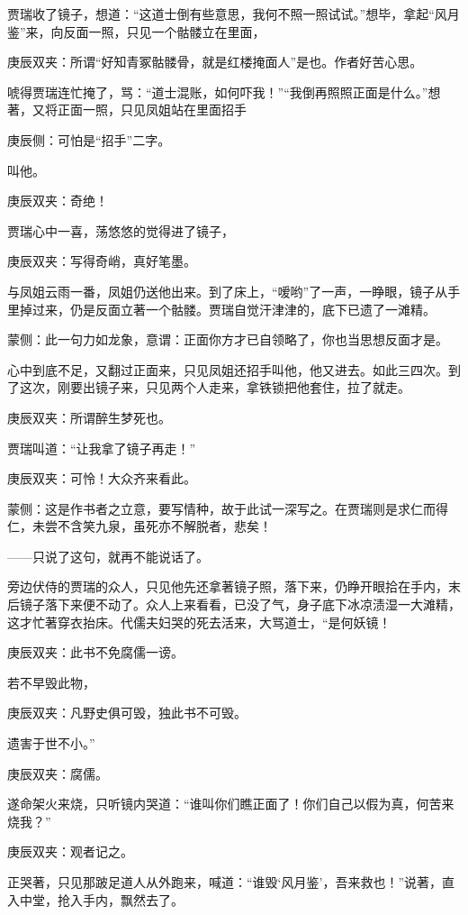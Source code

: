 \begin{parag}
    贾瑞收了镜子，想道：“这道士倒有些意思，我何不照一照试试。”想毕，拿起“风月鉴”来，向反面一照，只见一个骷髅立在里面，\begin{note}庚辰双夹：所谓“好知青冢骷髅骨，就是红楼掩面人”是也。作者好苦心思。\end{note}唬得贾瑞连忙掩了，骂：“道士混账，如何吓我！”“我倒再照照正面是什么。”想著，又将正面一照，只见凤姐站在里面招手\begin{note}庚辰侧：可怕是“招手”二字。\end{note}叫他。\begin{note}庚辰双夹：奇绝！\end{note}贾瑞心中一喜，荡悠悠的觉得进了镜子，\begin{note}庚辰双夹：写得奇峭，真好笔墨。\end{note}与凤姐云雨一番，凤姐仍送他出来。到了床上，“嗳哟”了一声，一睁眼，镜子从手里掉过来，仍是反面立著一个骷髅。贾瑞自觉汗津津的，底下已遗了一滩精。\begin{note}蒙侧：此一句力如龙象，意谓：正面你方才已自领略了，你也当思想反面才是。\end{note}心中到底不足，又翻过正面来，只见凤姐还招手叫他，他又进去。如此三四次。到了这次，刚要出镜子来，只见两个人走来，拿铁锁把他套住，拉了就走。\begin{note}庚辰双夹：所谓醉生梦死也。\end{note}贾瑞叫道：“让我拿了镜子再走！”\begin{note}庚辰双夹：可怜！大众齐来看此。\end{note}\begin{note}蒙侧：这是作书者之立意，要写情种，故于此试一深写之。在贾瑞则是求仁而得仁，未尝不含笑九泉，虽死亦不解脱者，悲矣！\end{note}——只说了这句，就再不能说话了。
\end{parag}


\begin{parag}
    旁边伏侍的贾瑞的众人，只见他先还拿著镜子照，落下来，仍睁开眼拾在手内，末后镜子落下来便不动了。众人上来看看，已没了气，身子底下冰凉渍湿一大滩精，这才忙著穿衣抬床。代儒夫妇哭的死去活来，大骂道士，“是何妖镜！\begin{note}庚辰双夹：此书不免腐儒一谤。\end{note}若不早毁此物，\begin{note}庚辰双夹：凡野史俱可毁，独此书不可毁。\end{note}遗害于世不小。”\begin{note}庚辰双夹：腐儒。\end{note}遂命架火来烧，只听镜内哭道：“谁叫你们瞧正面了！你们自己以假为真，何苦来烧我？”\begin{note}庚辰双夹：观者记之。\end{note}正哭著，只见那跛足道人从外跑来，喊道：“谁毁‘风月鉴’，吾来救也！”说著，直入中堂，抢入手内，飘然去了。
\end{parag}


